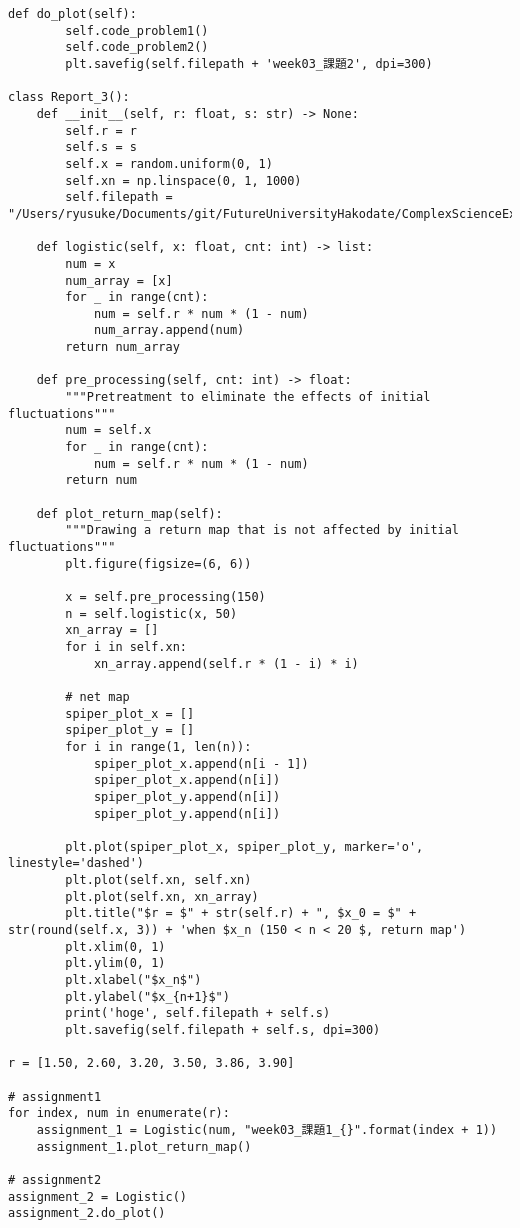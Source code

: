 \documentclass[dvipdfmx,uplatex]{jsarticle}
\begin{document}
\begin{lstlisting}[caption=Pythonによる課題１と課題２の描画]
    def do_plot(self):
        self.code_problem1()
        self.code_problem2()
        plt.savefig(self.filepath + 'week03_課題2', dpi=300)

class Report_3():
    def __init__(self, r: float, s: str) -> None:
        self.r = r
        self.s = s
        self.x = random.uniform(0, 1)
        self.xn = np.linspace(0, 1, 1000)
        self.filepath = "/Users/ryusuke/Documents/git/FutureUniversityHakodate/ComplexScienceExercise/result/"

    def logistic(self, x: float, cnt: int) -> list:
        num = x
        num_array = [x]
        for _ in range(cnt):
            num = self.r * num * (1 - num)
            num_array.append(num)
        return num_array

    def pre_processing(self, cnt: int) -> float:
        """Pretreatment to eliminate the effects of initial fluctuations"""
        num = self.x
        for _ in range(cnt):
            num = self.r * num * (1 - num)
        return num

    def plot_return_map(self):
        """Drawing a return map that is not affected by initial fluctuations"""
        plt.figure(figsize=(6, 6))

        x = self.pre_processing(150)
        n = self.logistic(x, 50)
        xn_array = []
        for i in self.xn:
            xn_array.append(self.r * (1 - i) * i)

        # net map
        spiper_plot_x = []
        spiper_plot_y = []
        for i in range(1, len(n)):
            spiper_plot_x.append(n[i - 1])
            spiper_plot_x.append(n[i])
            spiper_plot_y.append(n[i])
            spiper_plot_y.append(n[i])

        plt.plot(spiper_plot_x, spiper_plot_y, marker='o', linestyle='dashed')
        plt.plot(self.xn, self.xn)
        plt.plot(self.xn, xn_array)
        plt.title("$r = $" + str(self.r) + ", $x_0 = $" + str(round(self.x, 3)) + 'when $x_n (150 < n < 20 $, return map')
        plt.xlim(0, 1)
        plt.ylim(0, 1)
        plt.xlabel("$x_n$")
        plt.ylabel("$x_{n+1}$")
        print('hoge', self.filepath + self.s)
        plt.savefig(self.filepath + self.s, dpi=300)

r = [1.50, 2.60, 3.20, 3.50, 3.86, 3.90]

# assignment1
for index, num in enumerate(r):
    assignment_1 = Logistic(num, "week03_課題1_{}".format(index + 1))
    assignment_1.plot_return_map()

# assignment2
assignment_2 = Logistic()
assignment_2.do_plot()
\end{lstlisting}
\end{document}
